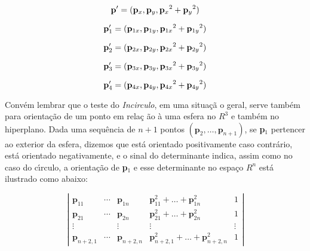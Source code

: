 \documentclass[12pt,a4paper]{book}
\begin{document}
\begin{equation} {\label{eq_de_p}}
\mathbf{p'} = (\mathbf{p}_x,\mathbf{p}_y,{\mathbf{p}_x}^2+{\mathbf{p}_y}^2)
\end{equation}

\begin{equation} {\label{eq_de_p1}}
\mathbf{p}_{1}' = (\mathbf{p}_{1x},\mathbf{p}_{1y},{\mathbf{p}_{1x}}^2+{\mathbf{p}_{1y}}^2)
\end{equation}

\begin{equation} {\label{eq_de_p2}}
\mathbf{p}_2' = (\mathbf{p}_{2x},\mathbf{p}_{2y},{\mathbf{p}_{2x}}^2+{\mathbf{p}_{2y}}^2)
\end{equation}

\begin{equation} {\label{eq_de_p3}}
\mathbf{p}_3' = (\mathbf{p}_{3x},\mathbf{p}_{3y},{\mathbf{p}_{3x}}^2+{\mathbf{p}_{3y}}^2)
\end{equation}

\begin{equation} {\label{eq_de_p4}}
\mathbf{p}_4' = (\mathbf{p}_{4x},\mathbf{p}_{4y},{\mathbf{p}_{4x}}^2+{\mathbf{p}_{4y}}^2)
\end{equation}

Conv\'{e}m lembrar que o teste do \textit{Incirculo}, em uma situa\c{c}\~{a}%
o geral, serve tamb\'{e}m para orienta\c{c}\~{a}o de um ponto em rela\c{c}%
\~{a}o \`{a} uma esfera no $R^{3}$ e tamb\'{e}m no hiperplano. Dada uma sequ\^{e}ncia 
de $n+1$ pontos $(\mathbf{p}%
_{2},\ldots ,\mathbf{p}_{n+1})$, se \textbf{p}$_{1}$ pertencer ao exterior
da esfera, dizemos que est\'{a} orientado positivamente caso contr\'{a}rio,
est\'{a} orientado negativamente, e o sinal do determinante indica, assim
como no caso do c\'{\i}rculo, a orienta\c{c}\~{a}o de \textbf{p}$_{1}$ e
esse determinante no espa\c{c}o $R^{n}$ est\'{a} ilustrado como abaixo:

\begin{equation}
\left\vert 
\begin{array}{ccccc}
\mathbf{p}_{11} & \cdots & \mathbf{p}_{1n} & \mathbf{p}_{11}^{2}+\ldots +%
\mathbf{p}_{1n}^{2} & 1 \\ 
\mathbf{p}_{21} & \cdots & \mathbf{p}_{2n} & \mathbf{p}_{21}^{2}+\ldots +%
\mathbf{p}_{2n}^{2} & 1 \\ 
\vdots &  & \vdots & \vdots & \vdots \\ 
\mathbf{p}_{n+2,1} & \cdots & \mathbf{p}_{n+2,n} & \mathbf{p}%
_{n+2,1}^{2}+\ldots +\mathbf{p}_{n+2,n}^{2} & 1%
\end{array}%
\right\vert
\end{equation}
\end{document}
